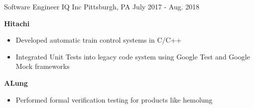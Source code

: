 \begin{cventries}
\cventry
{Software Engineer} %
{IQ Inc} %
{Pittsburgh, PA } %
{July 2017 - Aug. 2018} %
{ %
\begin{cvitems}
\item 
{
    \textbf{Hitachi}
    \begin{itemize}
        \item Developed automatic train control systems in C/C++
        \item Integrated Unit Tests into legacy code system using Google Test and Google Mock frameworks
    \end{itemize} 
}
\item 
{
    \textbf{ALung}
    \begin{itemize}
        \item Performed formal verification testing for products like hemolung
    \end{itemize} 
}  
\end{cvitems}
}




\end{cventries}